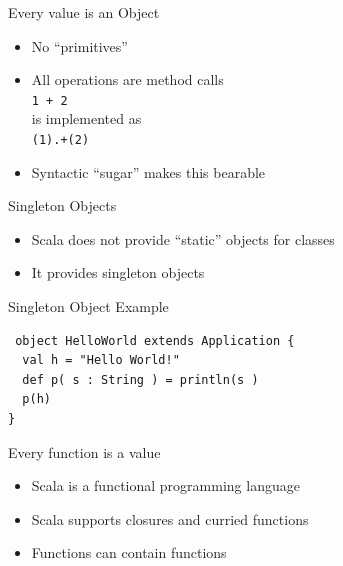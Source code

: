 \documentclass[t]{beamer}
\begin{document}
\begin{frame}{Every value is an Object}
  \begin{itemize}
  \item No ``primitives''
  \item All operations are method calls\\
    {\tt  1 + 2 }\\

    is implemented as\\

    {\tt (1).+(2)}\\

    \item Syntactic ``sugar'' makes this bearable
  \end{itemize}
\note{}
 \end{frame}


\begin{frame}{Singleton Objects}
  \begin{itemize}
  \item Scala does not provide ``static'' objects for classes
  \item It provides singleton objects
  \end{itemize}
  \note{}
\end{frame}


\begin{frame}[fragile]{Singleton Object Example}
  \begin{tiny}
  \begin{verbatim}
 object HelloWorld extends Application { 
  val h = "Hello World!"
  def p( s : String ) = println(s )
  p(h)
}
  \end{verbatim}
  \end{tiny}
  \note{}
\end{frame}

\begin{frame}{Every function is a value}
  \begin{itemize}
  \item Scala is a functional programming language
  \item Scala supports closures and curried functions
  \item Functions can contain functions
  \end{itemize}
  \note{}
\end{frame}
\end{document}
